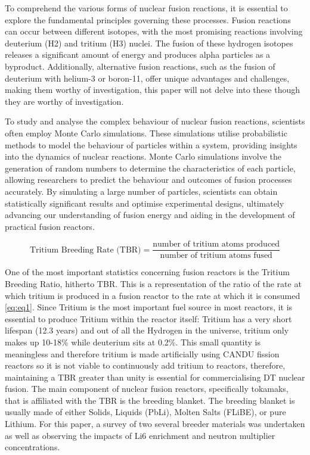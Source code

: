 \documentclass{article}
\begin{document}
To comprehend the various forms of nuclear fusion reactions, it is essential to explore the fundamental principles governing these processes. Fusion reactions can occur between different isotopes, with the most promising reactions involving deuterium (H2) and tritium (H3) nuclei. The fusion of these hydrogen isotopes releases a significant amount of energy and produces alpha particles as a byproduct. Additionally, alternative fusion reactions, such as the fusion of deuterium with helium-3 or boron-11, offer unique advantages and challenges, making them worthy of investigation, this paper will not delve into these though they are worthy of investigation.

To study and analyse the complex behaviour of nuclear fusion reactions, scientists often employ Monte Carlo simulations. These simulations utilise probabilistic methods to model the behaviour of particles within a system, providing insights into the dynamics of nuclear reactions. Monte Carlo simulations involve the generation of random numbers to determine the characteristics of each particle, allowing researchers to predict the behaviour and outcomes of fusion processes accurately. By simulating a large number of particles, scientists can obtain statistically significant results and optimise experimental designs, ultimately advancing our understanding of fusion energy and aiding in the development of practical fusion reactors.

\begin{equation}
    \label{eq:eq1}
    \text{Tritium Breeding Rate (TBR)} = \frac{\text{number of tritium atoms produced}}{\text{number of tritium atoms fused}}
\end{equation}

One of the most important statistics concerning fusion reactors is the Tritium Breeding Ratio, hitherto TBR. This is a representation of the ratio of the rate at which tritium is produced in a fusion reactor to the rate at which it is consumed \ref{eq:eq1}. Since Tritium is the most important fuel source in most reactors, it is essential to produce Tritium within the reactor itself: Tritium has a very short lifespan (12.3 years) and out of all the Hydrogen in the universe, tritium only makes up 10-18\% while deuterium sits at 0.2\%. This small quantity is meaningless and therefore tritium is made artificially using CANDU fission reactors so it is not viable to continuously add tritium to reactors, therefore, maintaining a TBR greater than unity is essential for commercialising DT nuclear fusion.
The main component of nuclear fusion reactors, specifically tokamaks, that is affiliated with the TBR is the breeding blanket. The breeding blanket is usually made of either Solids, Liquids (PbLi), Molten Salts (FLiBE), or pure Lithium. For this paper, a survey of two several breeder materials was undertaken as well as observing the impacts of Li6 enrichment and neutron multiplier concentrations.
\end{document}
